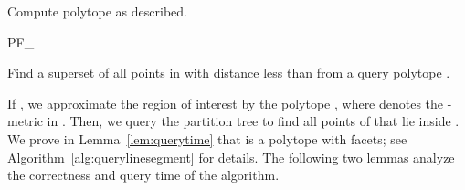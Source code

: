 \documentclass[a4paper,11pt]{paper}
\newenvironment{alg}{\begin{algorithm}[htbp]}{\end{algorithm}}
\begin{document}
\begin{alg}
 

 \If{}{
   
 } \ElseIf{ } {
  \label{alg:querylinesegment:d2start}
 Compute polytope  as described.
 \label{querylinesegment:computerectangle}

 PF_{\diamond}
 \label{alg:querylinesegment:d2end}

 }
 \Return{}\label{alg:querylinesegment:return}
\caption{Find a superset  of all points in  with distance
less than  from a query polytope .}
 \label{alg:querylinesegment}
\end{alg}

If , we approximate the region of interest by the
polytope
,
where  denotes the -metric
in .
Then, we query the partition tree  to find all points
of  that lie inside .
We prove in Lemma~\ref{lem:querytime} that  is
a polytope with
 facets;
see Algorithm~\ref{alg:querylinesegment} for details.
The following two lemmas analyze the correctness and
query time of the algorithm.
\end{document}
